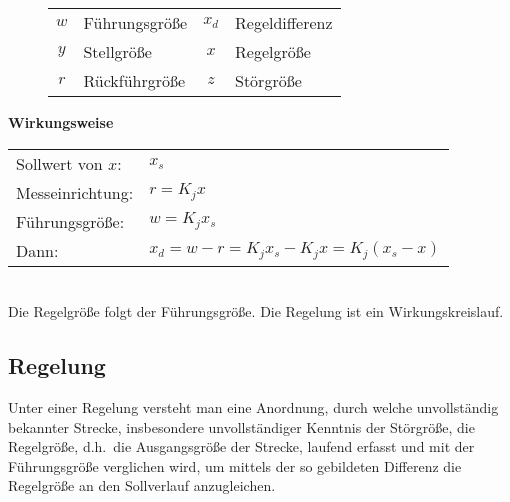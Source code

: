 \begin{figure}[!h]
  \centering
  \vspace{2em}

  \begin{tabular}{clcl}
    \(w\) & Führungsgröße & \(x_d\) & Regeldifferenz\\
    \(y\) & Stellgröße & \(x\) & Regelgröße\\
    \(r\) & Rückführgröße & \(z\) & Störgröße\\
  \end{tabular}
\end{figure}

\textbf{Wirkungsweise}\\
\begin{tabular}{ll}
  Sollwert von \(x\): & \(x_s\)\\
  Messeinrichtung: & \(r = K_j x\)\\
  Führungsgröße: & \(w = K_j x_s\)\\
  Dann: & \(x_d = w - r = K_j x_s - K_j x = K_j (x_s - x)\)\\
\end{tabular}\\
Die Regelgröße folgt der Führungsgröße. Die Regelung ist ein Wirkungskreislauf.\\

\subsection{Regelung}%
\label{reg:sub:regelung}
Unter einer Regelung versteht man eine Anordnung, durch welche unvollständig bekannter Strecke,
insbesondere unvollständiger Kenntnis der Störgröße, die Regelgröße, d.h.\ die Ausgangsgröße der Strecke,
laufend erfasst und mit der Führungsgröße verglichen wird, um mittels der so gebildeten Differenz die
Regelgröße an den Sollverlauf anzugleichen.

